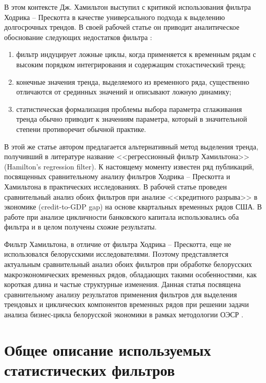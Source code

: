 \documentclass[a4paper,14pt]{extreport}
\begin{document}
	В этом контексте Дж. Хамильтон выступил с критикой использования фильтра Ходрика -- Прескотта в качестве универсального подхода к выделению долгосрочных трендов. В своей рабочей статье он приводит аналитическое обоснование следующих недостатков фильтра \cite{hamHP}:
	
	\begin{enumerate}
		\item фильтр индуцирует ложные циклы, когда применяется к временным рядам с высоким порядком интегрирования и содержащим стохастический тренд;
		\item конечные значения тренда, выделяемого из временного ряда, существенно отличаются от срединных значений и описывают ложную динамику;
		\item статистическая формализация проблемы выбора параметра сглаживания тренда обычно приводит к значениям параметра, который в значительной степени противоречит обычной практике.
	\end{enumerate}
	
	В этой же статье автором предлагается альтернативный метод выделения тренда, получивший в литературе название <<регрессионный фильтр Хамильтона>> (Hamilton's regression filter). К настоящему моменту известен ряд публикаций, посвященных сравнительному анализу фильтров Ходрика -- Прескотта и Хамильтона в практических исследованиях. В рабочей статье \cite{schuler_detrend} проведен сравнительный анализ обоих фильтров при анализе <<кредитного разрыва>> в экономике (credit-to-GDP gap) на основе квартальных временных рядов США. В работе \cite{haubrich_cyc_bank} при анализе цикличности банковского капитала использовались оба фильтра и в целом получены схожие результаты.
	
	Фильтр Хамильтона, в отличие от фильтра Ходрика -- Прескотта, еще не использовался белорусскими исследователями. Поэтому представляется актуальным сравнительный анализ обоих фильтров при обработке белорусских макроэкономических временных рядов, обладающих такими особенностями, как короткая длина и частые структурные изменения. Данная статья посвящена сравнительному анализу результатов применения фильтров для выделения трендовых и циклических компонентов временных рядов при решении задачи анализа бизнес-цикла белорусской экономики в рамках методологии ОЭСР \cite{oecdCycleExtraction, esiMaking}. 
	
	\section{Общее описание используемых статистических фильтров}
	
\end{document}
